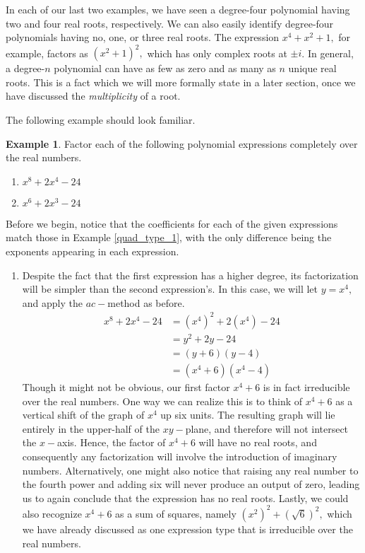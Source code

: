 \documentclass[12pt]{book}
\theoremstyle{definition}
\newtheorem{example}{Example}
\begin{document}
In each of our last two examples, we have seen a degree-four polynomial having two and four real roots, respectively.  We can also easily identify degree-four polynomials having no, one, or three real roots.  The expression $x^4+x^2+1,$ for example, factors as $\left(x^2+1\right)^2,$ which has only complex roots at $\pm i$.  In general, a degree-$n$ polynomial can have as few as zero and as many as $n$ unique real roots.  This is a fact which we will more formally state in a later section, once we have discussed the {\it multiplicity} of a root.
\par
The following example should look familiar.
\begin{example} Factor each of the following polynomial expressions completely over the real numbers.
\begin{multicols}{2}
\begin{enumerate}
\item $x^8+2x^4-24$
\item $x^6+2x^3-24$
\end{enumerate}
\end{multicols}
Before we begin, notice that the coefficients for each of the given expressions match those in Example \ref{quad_type_1}, with the only difference being the exponents appearing in each expression.
\begin{enumerate}
\item Despite the fact that the first expression has a higher degree, its factorization will be simpler than the second expression's.  In this case, we will let $y=x^4,$ and apply the $ac-$method as before.
\begin{equation*}
\begin{split}
x^8+2x^4-24&=\left(x^4\right)^2+2\left(x^4\right)-24\\
&=y^2+2y-24\\
&=\left(y+6\right)\left(y-4\right)\\
&=\left(x^4+6\right)\left(x^4-4\right)
\end{split}
\end{equation*}
Though it might not be obvious, our first factor $x^4+6$ is in fact irreducible over the real numbers.  One way we can realize this is to think of $x^4+6$ as a vertical shift of the graph of $x^4$ up six units.  The resulting graph will lie entirely in the upper-half of the $xy-$plane, and therefore will not intersect the $x-$axis.  Hence, the factor of $x^4+6$ will have no real roots, and consequently any factorization will involve the introduction of imaginary numbers.  Alternatively, one might also notice that raising any real number to the fourth power and adding six will never produce an output of zero, leading us to again conclude that the expression has no real roots.  Lastly, we could also recognize $x^4+6$ as a sum of squares, namely $\left(x^2\right)^2+\left(\sqrt{6}\right)^2,$ which we have already discussed as one expression type that is irreducible over the real numbers.

\end{enumerate}
\end{example}
\end{document}

